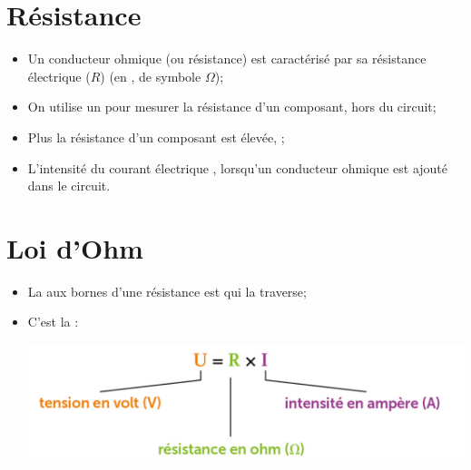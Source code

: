 \documentclass[xcolor={dvipsnames}]{beamer}
\begin{document}
\section{Résistance}
%
%	
%
%
\begin{frame}
	\begin{mybilan}
		\begin{itemize}
			\item Un conducteur ohmique (ou résistance) est caractérisé par sa résistance électrique ($R$) (en , de symbole $\Omega$);\pause
			\item On utilise un   pour mesurer la résistance d'un composant, hors du circuit;\pause
			\item Plus la résistance d'un composant est élevée, ;\pause
			\item L'intensité du courant électrique , lorsqu'un conducteur ohmique est ajouté dans le circuit.
		\end{itemize}
	\end{mybilan}
\end{frame}


\section{Loi d'Ohm}

\begin{frame}
	\begin{mybilan}
		\begin{itemize}
			\item La  aux bornes d'une résistance est  qui la traverse;\pause
			
			\item C'est la \kw{loi d'Ohm} :
			
				\begin{center}
					\includegraphics[scale=0.4]{../img/loi}
				\end{center}
		\end{itemize}
	\end{mybilan}
\end{frame}
\end{document}
